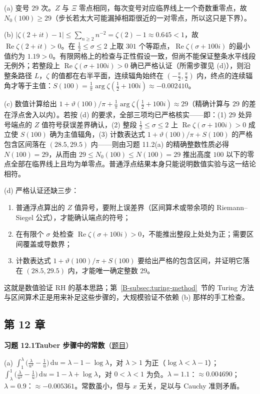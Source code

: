 \documentclass[11pt,a4paper]{article}
\newcommand{\dd}{\,\mathrm{d}}
\renewcommand{\Re}{\operatorname{Re}}
\newcommand{\bref}[1]{\ref*{B-#1}}
\newcommand{\Sol}[2]{%
  \par\addvspace{1.2em}\noindent
  \hypertarget{s:#1}{}\textbf{习题 #1\quad #2}\hfill{\small（\hyperlink{q:#1}{题目}）}\par
  \nopagebreak\smallskip}
\begin{document}
(a) 变号 $29$ 次。$Z$ 与 $\Xi$ 零点相同，每次变号对应临界线上一个奇数重零点，故 $N_0(100)\ge29$（步长若太大可能漏掉相距很近的一对零点，所以这只是下界）。

(b) $|\zeta(2+it)-1|\le\sum_{n\ge2}n^{-2}=\zeta(2)-1\approx0.645<1$，故 $\Re\zeta(2+it)>0$。在 $\frac12\le\sigma\le2$ 上取 $301$ 个等距点，$\Re\zeta(\sigma+100i)$ 的最小值约为 $1.19>0$。有限网格上的检查与正性假设一致，但尚不能保证整条水平线段无例外；若整段上 $\Re\zeta(\sigma+100i)>0$ 确已严格认证（所需步骤见 (d)），则沿整条路径 $L$，$\zeta$ 的值都在右半平面，连续辐角始终在 $(-\frac\pi2,\frac\pi2)$ 内，终点的连续辐角才等于主值：$S(100)=\frac1\pi\arg\zeta(\frac12+100i)\approx-0.002410$。

(c) 数值计算给出 $1+\vartheta(100)/\pi+\frac1\pi\arg\zeta(\frac12+100i)\approx29$（精确计算与 $29$ 的差在浮点舍入以内）。若按 (d) 的要求，全部三项均已严格核实——即：(1) $29$ 处异号端点的 $Z$ 值符号获误差界确认，(2) 整段 $\frac12\le\sigma\le2$ 上 $\Re\zeta(\sigma+100i)>0$ 成立使 $S(100)$ 确为主值辐角，(3) 计数表达式 $1+\vartheta(100)/\pi+S(100)$ 的严格包含区间落在 $(28.5,29.5)$ 内——则由习题 11.2(a) 的精确整数性质必得 $N(100)=29$，从而由 $29\le N_0(100)\le N(100)=29$ 推出高度 $100$ 以下的零点全部在临界线上且均为单零点。普通浮点结果本身只能说明数值实验与这一结论相符。

(d) 严格认证还缺三步：
\begin{enumerate}[label=\arabic*.]
  \item 普通浮点算出的 $Z$ 值异号，要附上误差界（区间算术或带余项的 Riemann--Siegel 公式），才能确认端点的符号；
  \item 在有限个 $\sigma$ 处检查 $\Re\zeta(\sigma+100i)>0$，不能推出整段上处处为正；需要区间覆盖或导数界；
  \item 计数表达式 $1+\vartheta(100)/\pi+S(100)$ 要给出严格的包含区间，并证明它落在 $(28.5,29.5)$ 内，才能唯一确定整数 $29$。
\end{enumerate}
这就是数值验证 RH 的基本思路；第~\bref{subsec:turing-method}~节的 Turing 方法与区间算术正是用来补足这些步骤的，大规模验证不依赖 (b) 那样的手工检查。

\subsection*{第 12 章}

\Sol{12.1}{Tauber 步骤中的常数}
(a) $\int_1^\lambda\bigl(\frac\lambda{u^2}-\frac1u\bigr)\dd u=\lambda-1-\log\lambda$，对 $\lambda>1$ 为正（$\log\lambda<\lambda-1$）；$\int_\lambda^1\bigl(\frac\lambda{u^2}-\frac1u\bigr)\dd u=1-\lambda+\log\lambda$，对 $0<\lambda<1$ 为负。$\lambda=1.1$：$\approx0.004690$；$\lambda=0.9$：$\approx-0.005361$。常数虽小，但与 $x$ 无关，足以与 Cauchy 准则矛盾。
\end{document}
